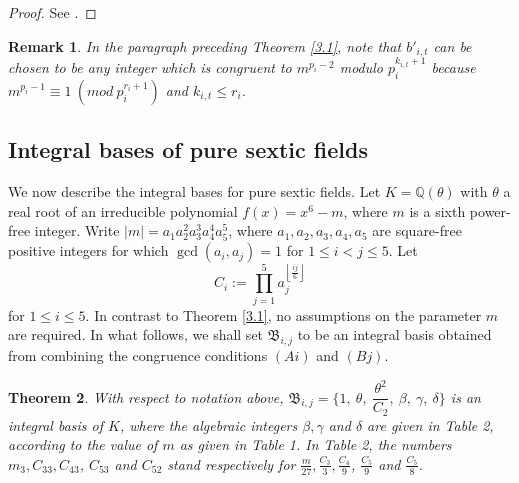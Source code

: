 \documentclass[table]{amsart}
\newtheorem{theorem}{Theorem}[section]
\newtheorem{remark}[theorem]{Remark}
\newcommand{\Q}{\mathbb{Q}}
\newcommand{\op}[1]{\operatorname{#1}}
\numberwithin{equation}{section}
\begin{document}
\begin{proof}
    See \cite[Theorem 1.6]{JKSMathematika}.
\end{proof}

\begin{remark}\label{3.5'} In the paragraph preceding Theorem \ref{3.1}, note that $b'_{i,t}$ can be chosen to be any integer which is congruent to $m^{p_i-2}$ modulo  $p_i^{k_{i,t}+1}$ because $m^{p_i -1} \equiv 1~(mod~p_i^{r_i+1})$ and $k_{i,t} \leq r_i$.
\end{remark}
\subsection{Integral bases of pure sextic fields}
\par We now describe the integral bases for pure sextic fields. Let $K = \Q(\theta)$ with $\theta$  a real root of an irreducible polynomial $f(x) = x^6 - m$, where $m$ is a sixth power-free integer. Write $|m|= a_1a_2^2a_3^3a_4^4a_5^5$, where $a_1, a_2, a_3, a_4, a_5$ are square-free positive integers for which $\op{gcd}(a_i, a_j)=1$ for $1\leq i<j\leq 5$. Let \begin{equation}\label{C_k defn}C_{i}:= \prod\limits_{j=1}^{5}a_j^{\left\lfloor\frac{ij}{6}\right\rfloor}\end{equation} for $1\leq i \leq 5$. In contrast to Theorem \ref{3.1}, no assumptions on the parameter $m$ are required. In what follows, we shall set $\mathfrak{B}_{i, j}$ to be an integral basis obtained from combining the congruence conditions $(Ai)$ and $(Bj)$.

\begin{theorem} \cite[Theorem 1.1]{J21} \label{Jakthm}With respect to notation above,
$\mathfrak{B}_{i,j}=\{1,~ \theta,~ \dfrac{\theta^2}{C_2},~\beta, ~\gamma, ~\delta\}$ is an integral basis of $K$, where the algebraic integers $\beta, \gamma$ and $\delta$ are given in Table 2, according to the value of $m$ as given in Table 1. In Table 2, the numbers $m_3, C_{33}, C_{43}$, $C_{53}$ and $C_{52}$ stand respectively for $\frac{m}{27}, \frac{C_3}{3}, \frac{C_4}{9}$, $\frac{C_5}{9}$ and $\frac{C_5}{8}$. 
\end{theorem}
\end{document}
